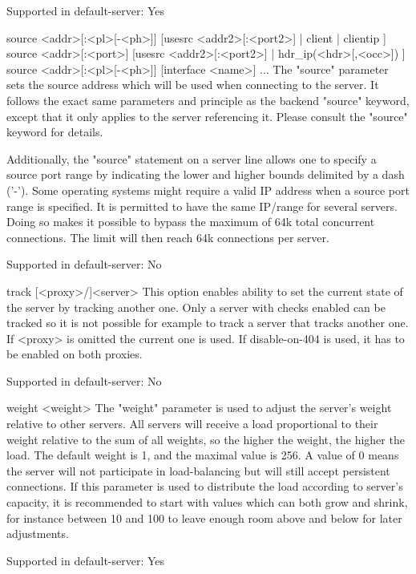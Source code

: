   Supported in default-server: Yes

source <addr>[:<pl>[-<ph>]] [usesrc { <addr2>[:<port2>] | client | clientip } ]
source <addr>[:<port>] [usesrc { <addr2>[:<port2>] | hdr_ip(<hdr>[,<occ>]) } ]
source <addr>[:<pl>[-<ph>]] [interface <name>] ...
  The "source" parameter sets the source address which will be used when
  connecting to the server. It follows the exact same parameters and principle
  as the backend "source" keyword, except that it only applies to the server
  referencing it. Please consult the "source" keyword for details.

  Additionally, the "source" statement on a server line allows one to specify a
  source port range by indicating the lower and higher bounds delimited by a
  dash ('-'). Some operating systems might require a valid IP address when a
  source port range is specified. It is permitted to have the same IP/range for
  several servers. Doing so makes it possible to bypass the maximum of 64k
  total concurrent connections. The limit will then reach 64k connections per
  server.

  Supported in default-server: No

track [<proxy>/]<server>
  This option enables ability to set the current state of the server by
  tracking another one. Only a server with checks enabled can be tracked
  so it is not possible for example to track a server that tracks another
  one. If <proxy> is omitted the current one is used. If disable-on-404 is
  used, it has to be enabled on both proxies.

  Supported in default-server: No

weight <weight>
  The "weight" parameter is used to adjust the server's weight relative to
  other servers. All servers will receive a load proportional to their weight
  relative to the sum of all weights, so the higher the weight, the higher the
  load. The default weight is 1, and the maximal value is 256. A value of 0
  means the server will not participate in load-balancing but will still accept
  persistent connections. If this parameter is used to distribute the load
  according to server's capacity, it is recommended to start with values which
  can both grow and shrink, for instance between 10 and 100 to leave enough
  room above and below for later adjustments.

  Supported in default-server: Yes
